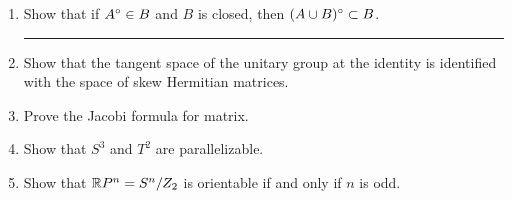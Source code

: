 \documentclass[11pt]{article}
\begin{document}
\begin{enumerate}
\hrule
\item Show that if $A^\o\in B$ and $B$ is closed, then $(A\cup B)^\o\subset B$.

\hrule
\item Show that the tangent space of the unitary group at the identity is identified with the space of skew Hermitian matrices.
\item Prove the Jacobi formula for matrix.
\item Show that $S^3$ and $T^2$ are parallelizable.
\item Show that $\mathbb{R} P^n=S^n/Z_2$ is orientable if and only if $n$ is odd.
\end{enumerate}
\end{document}
